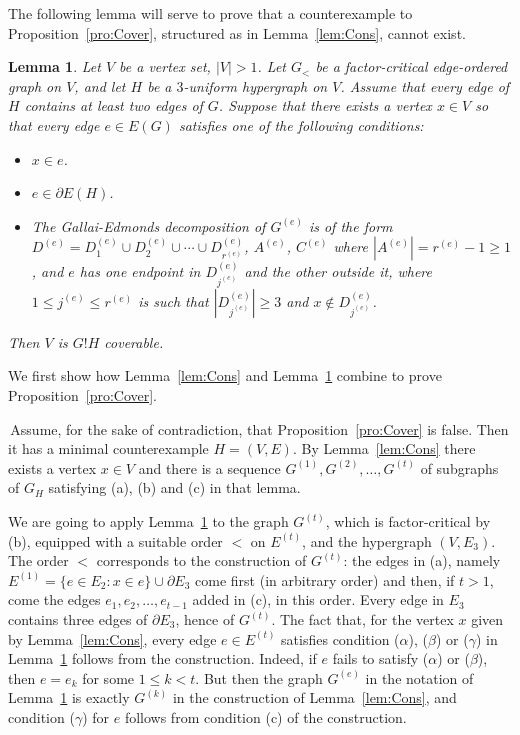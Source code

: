 \documentclass[10pt,a4paper]{amsart}
\newtheorem{lemma}[theorem]{Lemma}
\begin{document}
The following lemma will serve to prove that a counterexample to Proposition~\ref{pro:Cover}, structured as in Lemma~\ref{lem:Cons}, cannot exist.
\begin{lemma} \label{lem:G!H}
Let $V$ be a vertex set, $|V| > 1$. Let $G_<$ be a factor-critical edge-ordered graph on $V$, and let $H$ be a $3$-uniform hypergraph on $V$. Assume that every edge of $H$ contains at least two edges of $G$. Suppose that there exists a vertex $x \in V$ so that every edge $e \in E(G)$ satisfies one of the following conditions:
\begin{itemize}
    \item[($\alpha$)] $x \in e$.
    \item[($\beta$)] $e \in \partial E(H)$.
    \item[($\gamma$)] The Gallai-Edmonds decomposition of $G^{(e)}$ is of the form $D^{(e)} = D_1^{(e)} \cup D_2^{(e)} \cup \cdots \cup D_{r^{(e)}}^{(e)}$, $A^{(e)}$, $C^{(e)}$ where $|A^{(e)}| = r^{(e)} - 1 \ge 1$, and $e$ has one endpoint in $D_{j^{(e)}}^{(e)}$ and the other outside it, where $1 \le j^{(e)} \le r^{(e)}$ is such that $|D_{j^{(e)}}^{(e)}| \ge 3$ and $x \notin D_{j^{(e)}}^{(e)}$.
\end{itemize}
Then $V$ is $G!H$ coverable.
\end{lemma}
We first show how Lemma~\ref{lem:Cons} and Lemma~\ref{lem:G!H} combine to prove Proposition~\ref{pro:Cover}.

\vspace{10pt}

 \,Assume, for the sake of contradiction, that Proposition~\ref{pro:Cover} is false. Then it has a minimal counterexample $H = (V, E)$. By Lemma~\ref{lem:Cons} there exists a vertex $x \in V$ and there is a sequence $G^{(1)}, G^{(2)}, \ldots , G^{(t)}$ of subgraphs of $G_H$ satisfying (a), (b) and (c) in that lemma.

We are going to apply Lemma~\ref{lem:G!H} to the graph $G^{(t)}$, which is factor-critical by (b), equipped with a suitable order $<$ on $E^{(t)}$, and the hypergraph $(V, E_3)$. The order $<$ corresponds to the construction of $G^{(t)}$: the edges in (a), namely $E^{(1)} = \{e \in E_2: x \in e\} \cup \partial E_3$ come first (in arbitrary order) and then, if $t > 1$, come the edges $e_1, e_2, \ldots , e_{t-1}$ added in (c), in this order. Every edge in $E_3$ contains three edges of $\partial E_3$, hence of $G^{(t)}$. The fact that, for the vertex $x$ given by Lemma~\ref{lem:Cons}, every edge $e \in E^{(t)}$ satisfies condition ($\alpha$), ($\beta$) or ($\gamma$) in Lemma~\ref{lem:G!H} follows from the construction. Indeed, if $e$ fails to satisfy ($\alpha$) or ($\beta$), then $e = e_k$ for some $1 \le k < t$. But then the graph $G^{(e)}$ in the notation of Lemma~\ref{lem:G!H} is exactly $G^{(k)}$ in the construction of Lemma~\ref{lem:Cons}, and condition ($\gamma$) for $e$ follows from condition (c) of the construction.
\end{document}
